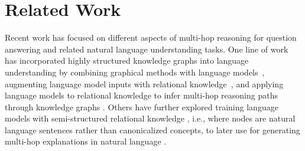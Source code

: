 \documentclass[letterpaper]{article} %
\begin{document}



\section{Related Work}


Recent work has focused on different aspects of multi-hop reasoning for question answering and related natural language understanding tasks. One line of work has incorporated highly structured knowledge graphs into language understanding by
combining graphical methods with language models~\cite{lin-etal-2019-kagnet,ji-etal-2020-language,yasunaga-etal-2021-qa},
augmenting language model inputs with relational knowledge~\cite{zhang-etal-2019-ernie,chen-etal-2020-improving,xu-etal-2021-fusing},
and applying language models to relational knowledge to infer multi-hop reasoning paths through knowledge graphs \cite{wang-etal-2020-connecting}. Others have further explored training language models with semi-structured relational knowledge \cite{sap2019atomic,bosselut-etal-2019-comet,mostafazadeh-etal-2020-glucose,Hwang2020COMETATOMIC}, i.e., where nodes are natural language sentences rather than canonicalized concepts, to later use for generating multi-hop explanations in natural language \cite{shwartz-etal-2020-unsupervised,Bosselut2019DynamicKG}.
\end{document}
